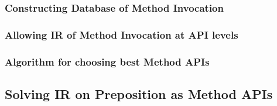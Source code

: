 \subsubsection{Constructing Database of Method Invocation}
\subsubsection{Allowing IR of Method Invocation at API levels}
\subsubsection{Algorithm for choosing best Method APIs
}
\subsection{Solving IR on Preposition as Method APIs}



